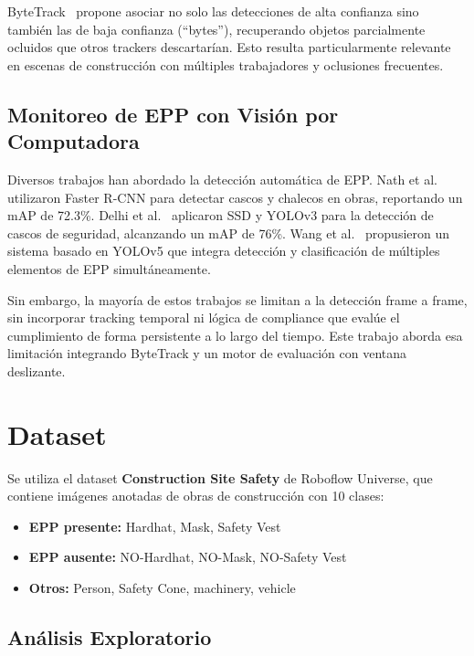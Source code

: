 \documentclass[conference, 10pt]{IEEEtran}
\begin{document}
ByteTrack~\cite{zhang2022bytetrack} propone asociar no solo las detecciones de alta confianza sino también las de baja confianza (``bytes''), recuperando objetos parcialmente ocluidos que otros trackers descartarían. Esto resulta particularmente relevante en escenas de construcción con múltiples trabajadores y oclusiones frecuentes.

\subsection{Monitoreo de EPP con Visión por Computadora}

Diversos trabajos han abordado la detección automática de EPP. Nath et al.~\cite{nath2020deep} utilizaron Faster R-CNN para detectar cascos y chalecos en obras, reportando un mAP de 72.3\%. Delhi et al.~\cite{delhi2020detection} aplicaron SSD y YOLOv3 para la detección de cascos de seguridad, alcanzando un mAP de 76\%. Wang et al.~\cite{wang2021ppe} propusieron un sistema basado en YOLOv5 que integra detección y clasificación de múltiples elementos de EPP simultáneamente.

Sin embargo, la mayoría de estos trabajos se limitan a la detección frame a frame, sin incorporar tracking temporal ni lógica de compliance que evalúe el cumplimiento de forma persistente a lo largo del tiempo. Este trabajo aborda esa limitación integrando ByteTrack y un motor de evaluación con ventana deslizante.

\section{Dataset}

Se utiliza el dataset \textbf{Construction Site Safety} de Roboflow Universe, que contiene imágenes anotadas de obras de construcción con 10 clases:

\begin{itemize}
    \item \textbf{EPP presente:} Hardhat, Mask, Safety Vest
    \item \textbf{EPP ausente:} NO-Hardhat, NO-Mask, NO-Safety Vest
    \item \textbf{Otros:} Person, Safety Cone, machinery, vehicle
\end{itemize}

\subsection{Análisis Exploratorio}
\end{document}
